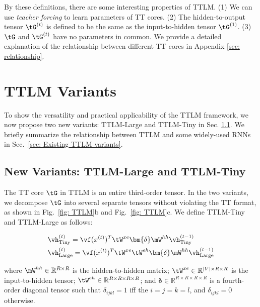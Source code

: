 \documentclass{article}
\theoremstyle{plain}
\theoremstyle{definition}
\theoremstyle{remark}
\begin{document}
By these definitions, there are some interesting properties of TTLM. (1) We can use \emph{teacher forcing} \citep{marcus1998rethinking} to learn parameters of TT cores. (2)  The hidden-to-output  tensor $\tG^{(t)}$ is defined to be the same as the input-to-hidden tensor $\tG^{(1)}$. (3) $\tG$ and $\tG^{(t)}$ have no parameters in common. We provide a detailed explanation of the  relationship between different TT cores in Appendix \ref{sec: relationship}. 



\section{TTLM Variants}

To show the versatility and practical applicability of the TTLM framework, we now propose two new variants: TTLM-Large and TTLM-Tiny in Sec. \ref{sec: Tinyttlm}.  We briefly summarize the relationship between TTLM and some widely-used RNNs in Sec.\ \ref{sec: Existing  TTLM variants}.

\subsection{New Variants: TTLM-Large and TTLM-Tiny}
\label{sec: Tinyttlm}

The TT core $\tG$ in TTLM is an entire third-order tensor. In the two variants, we decompose $\tG$ into several separate tensors without violating the TT format, as shown in Fig.\ \ref{fig: TTLM}b and Fig.\ \ref{fig: TTLM}c. We define TTLM-Tiny and TTLM-Large as follows:

\begin{equation}
\begin{split}
& \vh^{(t)}_{\textrm{Tiny}} = \vf (x^{(t)})^T \tW^{xe} \bm{\delta} \mW^{hh}\vh^{(t-1)}_{\textrm{Tiny}}\\
& \vh^{(t)}_{\textrm{Large}}  = \vf (x^{(t)})^T \tW^{xe} \tW^{eh}  \bm{\delta} \mW^{hh}\vh^{(t-1)}_{\textrm{Large}}\\
\end{split}
\end{equation}

where $\mW^{hh} \in \mathbb{R}^{R \times R}$ is the hidden-to-hidden matrix;  $\tW^{xe} \in \mathbb{R}^{|V| \times R \times R}$ is the input-to-hidden tensor; $\tW^{eh} \in \mathbb{R}^{R \times R \times R \times R}$; and $\bm{\delta} \in  \mathbb{R}^{R \times R \times R \times R}$ is a fourth-order diagonal tensor such that $\delta_{ijkl} = 1$ if{f} the $i = j = k = l$, and $\delta_{ijkl} = 0$ otherwise.  
\end{document}
